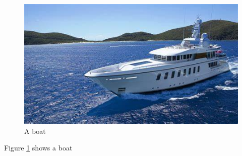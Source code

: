 \documentclass{article}
\begin{document}
	\begin{figure}
		\includegraphics[width=\linewidth]{boat.jpg}
		\caption{A boat}
		\label{fig:boat1}
	\end{figure}
Figure \ref{fig:boat1} shows a boat
\end{document}
